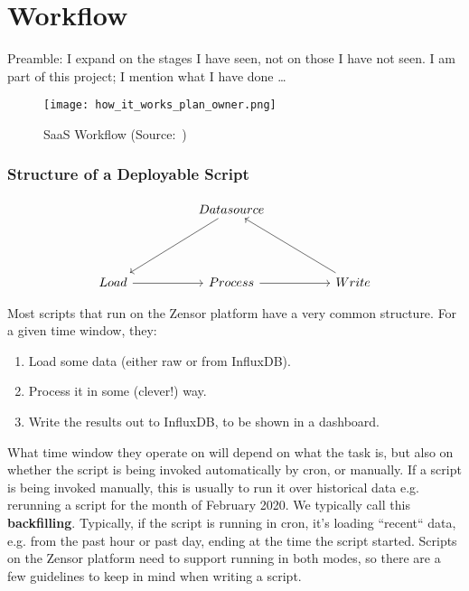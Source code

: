 \section{Workflow}
Preamble: I expand on the stages I have seen, not on those I have not seen.
I am part of this project; I mention what I have done \dots

\begin{figure}[ht]
    \centering
    \texttt{[image: how\_it\_works\_plan\_owner.png]}
    \caption{\acl{SaaS} Workflow (Source:~\cite{Misc:zensor_official_website})}
    \label{fig:zensor_flow}
\end{figure}

\subsubsection{Structure of a Deployable Script}\label{subsection:script_structure}
\[\begin{tikzcd}
		&& Datasource \\
		&& {} \\
		Load && Process && Write
		\arrow[from=3-1, to=3-3]
		\arrow[from=3-3, to=3-5]
		\arrow[from=1-3, to=3-1]
		\arrow[from=3-5, to=1-3]
	\end{tikzcd}\]

Most scripts that run on the Zensor platform have a very common structure. For a given time window, they:
\begin{enumerate}
	\item Load some data (either raw or from InfluxDB).
	\item Process it in some (clever!) way.
	\item Write the results out to InfluxDB, to be shown in a dashboard.
\end{enumerate}
What time window they operate on will depend on what the task is, but also on whether the script is being invoked automatically by cron, or manually.
If a script is being invoked manually, this is usually to run it over historical data e.g. rerunning a script for the month of February 2020. We typically call this \textbf{backfilling}.
Typically, if the script is running in cron, it's loading ``recent`` data, e.g. from the past hour or past day, ending at the time the script started.
Scripts on the Zensor platform need to support running in both modes, so there are a few guidelines to keep in mind when writing a script.

